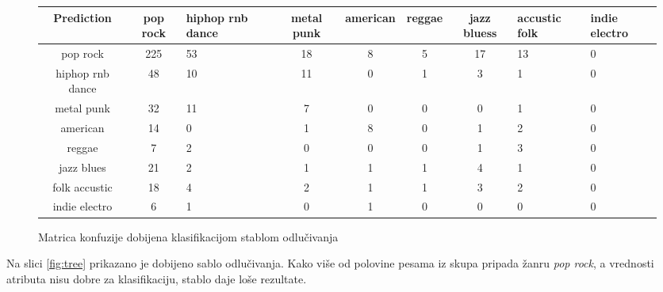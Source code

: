 \begin{center}
\begin{figure}[H]
    \footnotesize
    \begin{tabular}{|c|c|p{1.7cm}|c|c|c|c|p{1cm}|p{1cm}|}
        \hline
        Prediction & pop rock & hiphop rnb dance & metal punk & american & reggae & jazz bluess & accustic folk & indie electro \\
        \hline
        pop rock & 225 & 53 & 18 & 8 & 5 & 17 & 13 & 0 \\
        hiphop rnb dance & 48 & 10 & 11 & 0 & 1 & 3 & 1 & 0 \\
        metal punk & 32 & 11 & 7 & 0 & 0 & 0 & 1 & 0 \\
        american & 14 & 0 & 1 & 8 & 0 & 1 & 2 & 0 \\
        reggae & 7 & 2 & 0 & 0 & 0 & 1 & 3 & 0 \\
        jazz blues & 21 & 2 & 1 & 1 & 1 & 4 & 1 & 0 \\
        folk accustic & 18 & 4 & 2 & 1 & 1 & 3 & 2 & 0 \\
        indie electro & 6 & 1 & 0 & 1 & 0 & 0 & 0 & 0 \\
        \hline
    \end{tabular}
    \caption{Matrica konfuzije dobijena klasifikacijom stablom odlu\v{c}ivanja}
    \label{fig:confmatrtree}
\end{figure}
\end{center}

Na slici \ref{fig:tree} prikazano je dobijeno sablo odlu\v{c}ivanja. Kako vi\v{s}e od polovine pesama iz skupa pripada \v{z}anru \emph{pop rock}, a vrednosti atributa nisu dobre za klasifikaciju, stablo daje lo\v{s}e rezultate.


